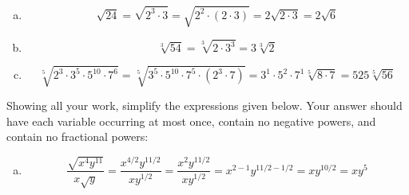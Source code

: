 \documentclass[12pt,letterpaper]{exam}
\begin{document}
\begin{questions}
 \pspace

\sol
\begin{enumerate}[(a)]
\item 
	\[
	\sqrt{24}= \sqrt{2^3 \cdot 3}= \sqrt{2^2 \cdot (2 \cdot 3)}= 2 \sqrt{2 \cdot 3}= 2 \sqrt{6}
	\] \pspace

\item 
	\[
	\sqrt[3]{54}= \sqrt[3]{2 \cdot 3^3}= 3 \sqrt[3]{2}
	\] \pspace

\item 
	\[
	\sqrt[5]{2^3 \cdot 3^5 \cdot 5^{10} \cdot 7^6}= \sqrt[5]{3^5 \cdot 5^{10} \cdot 7^5 \cdot (2^3 \cdot 7)}= 3^1 \cdot 5^2 \cdot 7^1 \sqrt[5]{8 \cdot 7}= 525 \sqrt[5]{56}
	\]
\end{enumerate}



\newpage
\question Showing all your work, simplify the expressions given below. Your answer should have each variable occurring at most once, contain no negative powers, and contain no fractional powers:
	 \pspace

\sol
\begin{enumerate}[(a)]
\item 
	\[
	\dfrac{\sqrt{x^4 y^{11}}}{x \sqrt{y}}= \dfrac{x^{4/2} y^{11/2}}{x y^{1/2}}= \dfrac{x^2 y^{11/2}}{x y^{1/2}}= x^{2-1} y^{11/2 - 1/2}= x y^{10/2}= x y^5
	\] \pspace


\end{enumerate}
\end{questions}
\end{document}
